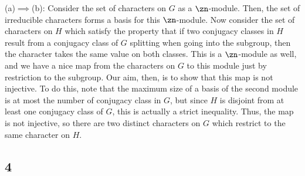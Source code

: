 \documentclass{article}
\begin{document}
(a)$\implies$(b): Consider the set of characters on $G$ as a $\zn$-module. Then, the set of irreducible characters forms a basis for this $\zn$-module. Now consider the set of characters on $H$ which satisfy the property that if two conjugacy classes in $H$ result from a conjugacy class of $G$ splitting when going into the subgroup, then the character takes the same value on both classes. This is a $\zn$-module as well, and we have a nice map from the characters on $G$ to this module just by restriction to the subgroup. Our aim, then, is to show that this map is not injective. To do this, note that the maximum size of a basis of the second module is at most the number of conjugacy class in $G$, but since $H$ is disjoint from at least one conjugacy class of $G$, this is actually a strict inequality. Thus, the map is not injective, so there are two distinct characters on $G$ which restrict to the same character on $H$.
\subsection*{4}
\end{document}
